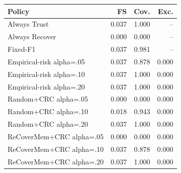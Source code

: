 \begin{tabular}{lrrr}
\toprule
Policy & FS & Cov. & Exc. \\
\midrule
Always Trust & 0.037 & 1.000 & -- \\
Always Recover & 0.000 & 0.000 & -- \\
Fixed-F1 & 0.037 & 0.981 & -- \\
Empirical-risk alpha=.05 & 0.037 & 0.878 & 0.000 \\
Empirical-risk alpha=.10 & 0.037 & 1.000 & 0.000 \\
Empirical-risk alpha=.20 & 0.037 & 1.000 & 0.000 \\
Random+CRC alpha=.05 & 0.000 & 0.000 & 0.000 \\
Random+CRC alpha=.10 & 0.018 & 0.943 & 0.000 \\
Random+CRC alpha=.20 & 0.037 & 1.000 & 0.000 \\
ReCoverMem+CRC alpha=.05 & 0.000 & 0.000 & 0.000 \\
ReCoverMem+CRC alpha=.10 & 0.037 & 0.878 & 0.000 \\
ReCoverMem+CRC alpha=.20 & 0.037 & 1.000 & 0.000 \\
\bottomrule
\end{tabular}
